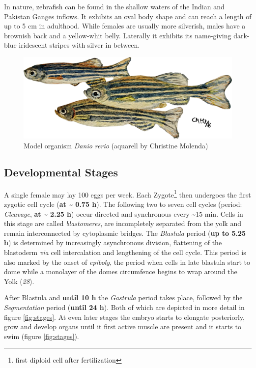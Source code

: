\documentclass[11pt,singlespacinge,twoside]{reedthesis} %
\theoremstyle{definition}
\theoremstyle{definition}
\theoremstyle{definition}
\theoremstyle{remark}
\begin{document}
In nature, zebrafish can be found in the shallow waters of the Indian and Pakistan Ganges inflows. It exhibits an oval body shape and can reach a length of up to 5 cm in adulthood. While females are usually more silverish, males have a brownish back and a yellow-whit belly. Laterally it exhibits its name-giving dark-blue iridescent stripes with silver in between.


\begin{figure}

{\centering \includegraphics[width=0.5\linewidth]{figures/intro/CM_fish} 

}

\caption[Model organism Danio rerio]{Model organism \emph{Danio rerio} (aquarell by Christine Molenda)}\label{fig:zebra}
\end{figure}
\hypertarget{developmental-stages}{%
\subsection{Developmental Stages}\label{developmental-stages}}

A single female may lay 100 eggs per week. Each Zygote\footnote{first diploid cell after fertilization} then undergoes the first zygotic cell cycle (\textbf{at \textasciitilde{} 0.75 h}). The following two to seven cell cycles (period: \emph{Cleavage}, \textbf{at \textasciitilde{} 2.25 h}) occur directed and synchronous every \textasciitilde15 min. Cells in this stage are called \emph{blastomeres}, are incompletely separated from the yolk and remain interconnected by cytoplasmic bridges. The \emph{Blastula} period (\textbf{up to 5.25 h}) is determined by increasingly asynchronous division, flattening of the blastoderm \emph{via} cell intercalation and lengthening of the cell cycle. This period is also marked by the onset of \emph{epiboly}, the period when cells in late blastula start to dome while a monolayer of the domes circumfence begins to wrap around the Yolk (\emph{28}).

After Blastula and \textbf{until 10 h} the \emph{Gastrula} period takes place, followed by the \emph{Segmentation} period (\textbf{until 24 h}). Both of which are depicted in more detail in figure \ref{fig:stages}. At even later stages the embryo starts to elongate posteriorly, grow and develop organs until it first active muscle are present and it starts to swim (figure \ref{fig:stages}).
\end{document}

